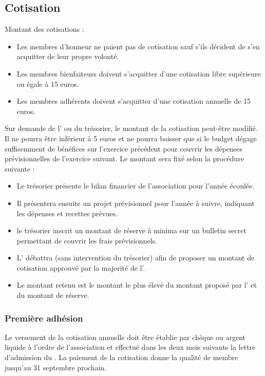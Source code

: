 \documentclass[a4paper,french,10pt]{article}
\begin{document}
\subsection{Cotisation}

Montant des cotisations :

\begin{itemize}
\item Les membres d'honneur ne paient pas de cotisation sauf s'ils décident de s'en acquitter de leur propre volonté.
\item Les membres bienfaiteurs doivent s'acquitter d'une cotisation libre supérieure ou égale à 15 euros.
\item Les membres adhérents doivent s'acquitter d'une cotisation annuelle de 15 euros.
\end{itemize}


Sur demande de l'\AG{} ou du trésorier, le montant de la cotisation peut-être modifié. Il ne pourra être inférieur à 5 euros et ne pourra baisser que si le budget dégage suffisemment de bénéfices sur l'exercice précédent pour couvrir les dépenses prévisionnelles de l'exercice suivant. Le montant sera fixé selon la procédure suivante :
\begin{itemize}
\item Le trésorier présente le bilan financier de l'association pour l'année écoulée.
\item Il présentera ensuite un projet prévisionnel pour l'année à suivre, indiquant les dépenses et recettes prévues.
\item le trésorier inscrit un montant de réserve à minima sur un bulletin secret permettant de couvrir les frais prévisionnels.
\item L'\AG{} débattra (sans intervention du trésorier) afin de proposer un montant de cotisation approuvé par la majorité de l'\AG{}.
\item Le montant retenu est le montant le plus élevé du montant proposé par l'\AG{} et du montant de réserve.
\end{itemize}

\subsubsection*{Première adhésion}

Le versement de la cotisation annuelle doit être établie par chèque ou argent liquide à l'ordre de l'association et effectué dans les deux mois suivants la lettre d'admission du \bureau{}. La paiement de la cotisation donne la qualité de membre jusqu'au 31 septembre prochain.
\end{document}
